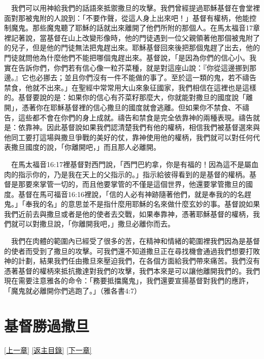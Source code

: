 \documentclass{book}
\begin{document}
　我們可以用神給我們的話語來抵禦撒旦的攻擊。我們曾經提過耶穌基督在會堂裡面對那被鬼附的人說到：「不要作聲，從這人身上出來吧！」基督有權柄，他能控制魔鬼。那些魔鬼聽了耶穌的話就出來離開了他們所附的那個人。在馬太福音17章裡記著說，當基督在山上改變形像時，他的門徒遇到一位父親領著他那個被鬼附了的兒子，但是他的門徒無法把鬼趕出來。耶穌基督回來後把那個鬼趕了出去，他的門徒就問他為什麼他們不能把哪個鬼趕出來。基督說，「是因為你們的信心小。我實在告訴你們，你們若有信心像一粒芥菜種，就是對這座山說：『你從這邊挪到那邊。』它也必挪去；並且你們沒有一件不能做的事了。至於這一類的鬼，若不禱告禁食，他就不出來。」在聖經中常常用大山來象征國家，我們相信在這裡也是這樣的。基督要說的是：如果你的信心有芥菜籽那麼大，你就能對撒旦的國度說「離開」，憑著你在耶穌基督裡的信心撒旦的國度就會逃離。但如果你不禁食、不禱告，這些都不會在你們的身上成就。禱告和禁食是完全依靠神的兩種表現。禱告就是：依靠神。因此基督說如果我們認清楚我們有他的權柄，相信我們被基督選來與他同工要打這場與撒旦爭戰的美好的仗，靠神使用他的權柄，我們就可以對任何代表撒旦國度的說，「你離開吧，」而且那人必離開。

　在馬太福音16:17裡基督對西門說，「西門巴約拿，你是有福的！因為這不是屬血肉的指示你的，乃是我在天上的父指示的。」指示給彼得看到的是基督的權柄。基督是那要來掌管一切的，而且他要掌管的不僅是這個世界，他還要掌管撒旦的國度。基督在馬可福音16:16裡說，「信的人必有神跡隨著他們，就是奉我的的名趕鬼。」「奉我的名」的意思並不是指什麼用耶穌的名來做什麼玄妙的事。基督說如果我們近前去與撒旦或者是他的使者去交戰，如果奉靠神，憑著耶穌基督的權柄，我們就可以對撒旦說，「你離開我吧，」撒旦必離你而去。

　我們在肉體的範圍內已經受了很多的苦，在精神和情緒的範圍裡我們因為是基督的使者而受到了撒旦的攻擊。可我們還不知道撒旦正在尋找機會通過我們想要打敗神的計劃，結果我們任由撒旦來壓迫我們，在各個方面給我們帶來痛苦。我們沒有憑著基督的權柄來抵抗撒達對我們的攻擊，我們本來是可以讓他離開我們的。我們現在需要注意雅各的命令：「務要抵擋魔鬼」，我們還要宣揚基督對我們的應許，「魔鬼就必離開你們逃跑了。」（雅各書4:7）

\chapter{基督勝過撒旦}
\label{sec:ch16}
\hyperref[sec:ch15]{[上一章]}
\hyperlink{toc}{[返主目錄]}
\hyperref[sec:ch17]{[下一章]}
\end{document}
